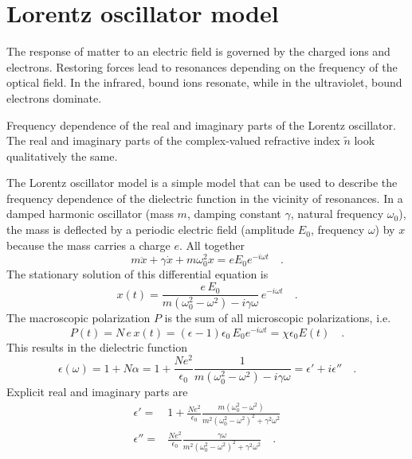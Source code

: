 \section{Lorentz oscillator model}

The response of matter to an electric field is governed by the charged ions and electrons. Restoring forces lead to resonances depending on the frequency of the optical field. In the infrared, bound ions resonate, while in the ultraviolet, bound electrons dominate.


\begin{marginfigure}

\caption{Frequency dependence of the real and imaginary parts of the Lorentz oscillator. The real and imaginary parts of the complex-valued refractive index $\tilde{n}$ look qualitatively the same. \label{fig:diel_lorentz}}
\end{marginfigure}

The Lorentz oscillator model is a simple model that can be used to describe the frequency dependence of the dielectric function in the vicinity of resonances. In a damped harmonic oscillator (mass $m$, damping constant $\gamma$, natural frequency $\omega_0$), the mass is deflected by a periodic electric field (amplitude $E_0$, frequency $\omega$) by $x$ because the mass carries a charge $e$. All together
\begin{equation}
 m \ddot{x} + \gamma \dot{x} + m \omega_0^2 x = e E_0 e^{- i \omega t} \quad .
\end{equation}
The stationary solution of this differential equation is
\begin{equation}
 x(t) = \frac{e \, E_0}{m (\omega_0^2 - \omega^2) - i \gamma \omega} \, e^{- i \omega t} \quad .
\end{equation}
The macroscopic polarization $P$ is the sum of all microscopic polarizations, i.e.
\begin{equation}
P(t) = N \, e \,x(t) = (\epsilon -1 ) \epsilon_0 \, E_0 e^{- i \omega t}
= \chi \epsilon_0 E(t) \quad .
\end{equation}
This results in the dielectric function
\begin{equation}
\epsilon(\omega) = 1 + N \alpha = 1 +\frac{N e^2}{\epsilon_0} \frac{1}{m (\omega_0^2 - \omega^2) - i \gamma \omega} = \epsilon' + i \epsilon'' \quad .
\end{equation}
Explicit real and imaginary parts are
\begin{align}
 \epsilon' = & 1 + \frac{N e^2}{\epsilon_0} \frac{ m (\omega_0^2 - \omega^2)}{m^2 (\omega_0^2 - \omega^2)^2 + \gamma^2 \omega^2}  \\
  \epsilon'' = & \frac{N e^2}{\epsilon_0} \frac{ \gamma \omega }{m^2 (\omega_0^2 - \omega^2)^2 + \gamma^2 \omega^2}  \quad .
\end{align}


